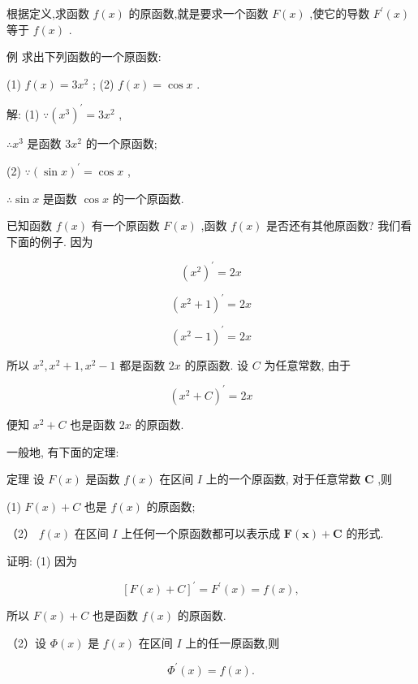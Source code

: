\documentclass[lang=cn,newtx,10pt,scheme=chinese]{elegantbook}
\begin{document}
根据定义,求函数 \(f\left( x\right)\) 的原函数,就是要求一个函数 \(F\left( x\right)\) ,使它的导数 \({F}^{\prime }\left( x\right)\) 等于 \(f\left( x\right)\) .

例 求出下列函数的一个原函数:

(1) \(f\left( x\right) = 3{x}^{2}\) ; (2) \(f\left( x\right) = \cos x\) .

解: (1) \(\because {\left( {x}^{3}\right) }^{\prime } = 3{x}^{2}\) ,

\(\therefore {x}^{3}\) 是函数 \(3{x}^{2}\) 的一个原函数;

(2) \(\because {\left( \sin x\right) }^{\prime } = \cos x\) ,

\(\therefore \sin x\) 是函数 \(\cos x\) 的一个原函数.

已知函数 \(f\left( x\right)\) 有一个原函数 \(F\left( x\right)\) ,函数 \(f\left( x\right)\) 是否还有其他原函数? 我们看下面的例子. 因为

\[
{\left( {x}^{2}\right) }^{\prime } = {2x}
\]

\[
{\left( {x}^{2} + 1\right) }^{\prime } = {2x}
\]

\[
{\left( {x}^{2} - 1\right) }^{\prime } = {2x}
\]

所以 \({x}^{2},{x}^{2} + 1,{x}^{2} - 1\) 都是函数 \({2x}\) 的原函数. 设 \(C\) 为任意常数, 由于

\[
{\left( {x}^{2} + C\right) }^{\prime } = {2x}
\]

便知 \({x}^{2} + C\) 也是函数 \({2x}\) 的原函数.

一般地, 有下面的定理:

定理 设 \(F\left( x\right)\) 是函数 \(f\left( x\right)\) 在区间 \(I\) 上的一个原函数, 对于任意常数 \(\mathbf{C}\) ,则

(1) \(F\left( x\right) + C\) 也是 \(f\left( x\right)\) 的原函数;

（2） \(f\left( x\right)\) 在区间 \(I\) 上任何一个原函数都可以表示成 \(\mathbf{F}\left( \mathbf{x}\right) + \mathbf{C}\) 的形式.

证明: (1) 因为

\[
{\left\lbrack F\left( x\right) + C\right\rbrack }^{\prime } = {F}^{\prime }\left( x\right) = f\left( x\right) ,
\]

所以 \(F\left( x\right) + C\) 也是函数 \(f\left( x\right)\) 的原函数.

（2）设 \(\Phi \left( x\right)\) 是 \(f\left( x\right)\) 在区间 \(I\) 上的任一原函数,则

\[
{\Phi }^{\prime }\left( x\right) = f\left( x\right) .
\]
\end{document}

